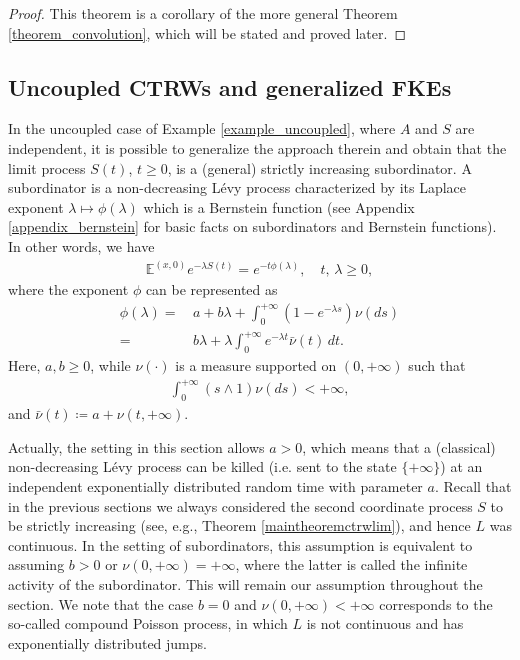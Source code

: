 \documentclass[reqno]{amsart}
\theoremstyle{remark}
\numberwithin{equation}{section} %
\newcommand{\1}{\mathds{1}}
\begin{document}
	\begin{proof}
		This theorem is a corollary of the more general Theorem \ref{theorem_convolution}, which will be stated and proved later.
	\end{proof}
	
	\subsection{Uncoupled CTRWs and generalized FKEs}
	\label{sec_generalized_fractional}
	In the uncoupled case of Example \ref{example_uncoupled}, where $A$ and $S$ are independent, it is possible to generalize the approach therein and obtain that the limit process $S(t)$, $t\ge0$, is a (general) strictly increasing subordinator. A subordinator is a non-decreasing L\'evy process characterized by its Laplace exponent $\lambda\mapsto \phi (\lambda)$  which is a Bernstein function (see {Appendix} \ref{appendix_bernstein} for basic facts on subordinators and Bernstein functions). In other words, we have
	\begin{align}
		\mathds{E}^{(x,0)}e^{-\lambda S(t)} = e^{-t\phi(\lambda)},\quad t,\,\lambda\ge0,
	\end{align}
	where the exponent $\phi$ can be represented as
	\begin{align}
		\phi (\lambda) = \,& a + b \lambda + \int_0^{+\infty} \left( 1-e^{-\lambda s} \right) \nu(ds) \label{bernstein-eq0}\\
		= \, & b\lambda + \lambda \int_0^{+\infty} e^{-\lambda t} \bar{\nu}(t) \, dt .
		\label{bernstein-eq}
	\end{align}
	Here,  $a,b\ge0$, while $\nu (\cdot)$ is a measure supported on $(0, +\infty)$ such that
	\begin{align}
		\int_0^{+\infty} \left( s \wedge 1 \right) \nu (ds) < +\infty,
	\end{align}
	and $\bar{\nu}(t)\coloneqq a+\nu(t, +\infty)$. 
	
	Actually, the setting in this section allows $a>0$, which means that a (classical) non-decreasing L\'evy process can be killed (i.e. sent to the state $\{+\infty\}$) at an independent exponentially distributed random time with parameter $a$. Recall that in the previous sections we always considered the second coordinate process $S$ to be strictly increasing (see, e.g.,  Theorem \ref{maintheoremctrwlim}), and hence $L$ was continuous. In the setting of subordinators, this assumption is equivalent to assuming $b>0$ or $\nu(0, +\infty) = +\infty$, where the latter is called the infinite activity of the subordinator. This will remain our assumption throughout the section. We note that the case $b=0$ and $\nu(0, +\infty) < +\infty$ corresponds to the so-called compound Poisson process, in which $L$ is not continuous and has exponentially distributed jumps. 
	
\end{document}

